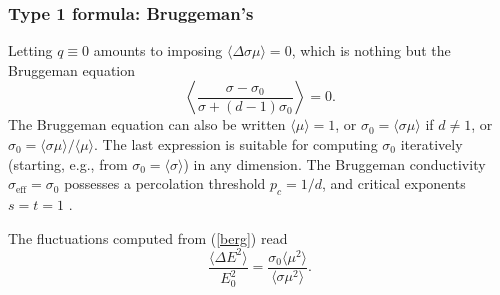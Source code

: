 \subsubsection{Type 1 formula: Bruggeman's}
Letting $q\equiv 0$ amounts to imposing $\langle\Delta\sigma
\mu\rangle=0$, which is nothing but the Bruggeman equation
\begin{equation}
\left\langle\frac{\sigma-\sigma_0}{\sigma+(d-1)\sigma_0}\right\rangle=0.
\end{equation}
The Bruggeman equation can also be written $\langle\mu\rangle=1$, or $\sigma_0=\langle\sigma\mu\rangle$ if $d\not= 1$, or $\sigma_0=\langle\sigma\mu\rangle/\langle\mu\rangle$.
The last expression is suitable for computing $\sigma_0$ iteratively
(starting, e.g., from $\sigma_0=\langle\sigma\rangle$) in any
dimension. The Bruggeman conductivity $\sigma_{\text{eff}}
=\sigma_0$ possesses a percolation threshold $p_c=1/d$, and critical
exponents $s=t=1$ \cite{CLER90}.

The fluctuations computed from (\ref{berg}) read
\begin{equation}
\frac{\langle\Delta E^2\rangle}{E_0^2}=
\frac{\sigma_0\langle\mu^2\rangle}
{\langle\sigma\mu^2\rangle}.
\end{equation}

